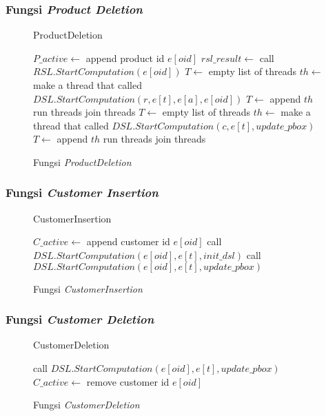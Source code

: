\subsubsection{Fungsi \textit{Product Deletion}}
\begin{figure}[H]
	\begin{algorithm}[H]
		\label{algo:product-deletion}
		\caption{ProductDeletion}
		\begin{algorithmic}[1]
			\State $P\_active \gets$ append product id $e[oid]$
			\State $rsl\_result \gets $ call $RSL.StartComputation(e[oid])$
			\State $T \gets$ empty list of threads
			 
			\State $th \gets$ make a thread that called $DSL.StartComputation(r, e[t], e[a], e[oid])$
			\State $T \gets$ append $th$
			\EndFor
			\State run threads
			\State join threads
			\State $T \gets$ empty list of threads
			 
			\State $th \gets$ make a thread that called $DSL.StartComputation(c, e[t], update\_pbox)$
			\State $T \gets$ append $th$
			\EndFor
			\State run threads
			\State join threads
		\end{algorithmic} 
	\end{algorithm}
	\caption{Fungsi \textit{ProductDeletion}}
\end{figure}

\subsubsection{Fungsi \textit{Customer Insertion}}
\begin{figure}[H]
	\begin{algorithm}[H]
		\label{algo:customer-insertion}
		\caption{CustomerInsertion}
		\begin{algorithmic}[1]
			\State $C\_active \gets$ append customer id $e[oid]$ 
			\State call $DSL.StartComputation(e[oid], e[t], init\_dsl)$
			\State call $DSL.StartComputation(e[oid], e[t], update\_pbox)$
		\end{algorithmic} 
	\end{algorithm}
	\caption{Fungsi \textit{CustomerInsertion}}
\end{figure}

\subsubsection{Fungsi \textit{Customer Deletion}}
\begin{figure}[H]
	\begin{algorithm}[H]
		\label{algo:customer-deletion}
		\caption{CustomerDeletion}
		\begin{algorithmic}[1]
			\State call $DSL.StartComputation(e[oid], e[t], update\_pbox)$
			\State $C\_active \gets$ remove customer id $e[oid]$ 
		\end{algorithmic} 
	\end{algorithm}
	\caption{Fungsi \textit{CustomerDeletion}}
\end{figure}

